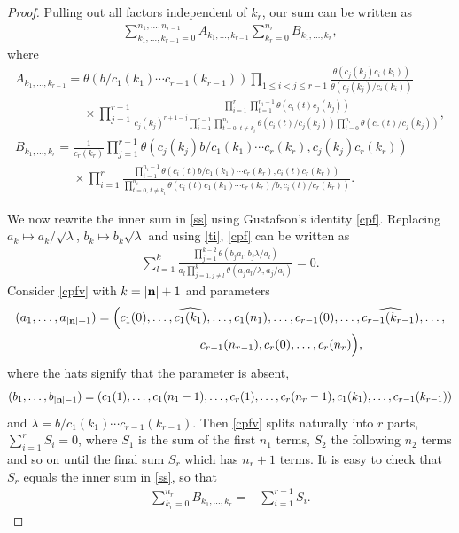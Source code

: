 \documentclass[pdftex]{sigma}%
\numberwithin{equation}{section}
\begin{document}
\begin{proof}
 Pulling out all factors independent of $k_r$, our
sum can be written as
\begin{gather}\label{ss}
\sum_{k_1,\dots,k_{r-1}=0}^{n_1,\dots,n_{r-1}}A_{k_1,\dots,k_{r-1}}
\sum_{k_r=0}^{n_r}B_{k_1,\dots,k_{r}},
\end{gather}
where
\begin{gather*}
A_{k_1,\dots,k_{r-1}}
=\theta(b/c_1(k_1)\dotsm c_{r-1}(k_{r-1}))\prod\limits_{1\leq i<j\leq
 r-1}\frac{\theta(c_j(k_j)c_i(k_i))}{\theta(c_j(k_j)/c_i(k_i))}
 \\ \phantom{A_{k_1,\dots,k_{r-1}}=}{}
\times\prod\limits_{j=1}^{r-1}\frac{\prod\limits_{i=1}^r\prod\limits_{t=1}^{n_i-1}
\theta(c_i(t)c_j(k_j))}
{c_j(k_j)^{r+1-j}\prod\limits_{i=1}^{r-1}\prod\limits_{t=0,\,t\neq
 k_i}^{n_i}\theta(c_i(t)/c_j(k_j))\prod\limits_{t=0}^{n_r}\theta(c_r(t)/c_j(k_j))},
\\
B_{k_1,\dots,k_{r}}=
\frac{1}{c_r(k_r)}\prod\limits_{j=1}^{r-1}
\theta(c_j(k_j)b/c_1(k_1)\dotsm c_r(k_r),c_j(k_j)c_r(k_r))
\\ \phantom{B_{k_1,\dots,k_{r}}=}{}
\times\prod\limits_{i=1}^r\frac{\prod\limits_{t=1}^{n_i-1}\theta(c_i(t)b/c_1(k_1)\dotsm
 c_r(k_r),c_i(t)c_r(k_r))}{\prod\limits_{t=0,\,t\neq
 k_i}^{n_i}\theta(c_i(t)c_1(k_1)\dotsm
 c_r(k_r)/b,c_i(t)/c_r(k_r))}.
 \end{gather*}

We now rewrite the inner sum in \eqref{ss} using
 Gustafson's identity \eqref{cpf}. Replacing $a_k\mapsto
a_k/\sqrt\lambda$, $b_k\mapsto b_k\sqrt\lambda$ and using \eqref{ti},
\eqref{cpf} can be written as
\begin{gather}\label{cpfv}
\sum_{l=1}^k\frac{\prod\limits_{j=1}^{k-2}\theta(b_ja_l,b_j\lambda/a_l)}
{a_l\prod\limits_{j=1, j\neq l}^k\theta(a_ja_l/\lambda,a_j/a_l)}=0.
\end{gather}
Consider \eqref{cpfv} with $k=|{\bf n}|+1$ and parameters
\begin{gather*}
(a_1,\dots,a_{|{\bf n}|+1})=
\Big(c_1(0),\dots,\widehat{c_1(k_1)},\dots,c_1(n_1),\dots, c_{r-1}(0),\dots,\widehat{c_{r-1}(k_{r-1})},
\dots,
\\ \phantom{(a_1,\dots,a_{|{\bf n}|+1})=(}
c_{r-1}(n_{r-1}), c_r(0),\dots,c_r(n_r)\Big),
\end{gather*}
where the hats signify that the parameter is absent,
\begin{gather*}
(b_1,\dots,b_{|{\bf n}|-1})=
(c_1(1),\dots,c_1(n_1-1),\dots, c_r(1),\dots,c_r(n_r-1),
c_1(k_1),\dots,c_{r-1}(k_{r-1}))
\end{gather*}
and $\lambda=b/c_1(k_1)\dotsm c_{r-1}(k_{r-1})$. Then \eqref{cpfv}
splits naturally into $r$ parts, $\sum_{i=1}^rS_i=0$, where $S_1$ is
the sum of the first $n_1$ terms, $S_2$ the following $n_2$ terms and
so on until the final sum $S_r$ which has $n_r+1$ terms. It is
easy to check that $S_r$ equals the inner sum in \eqref{ss}, so that
\begin{gather*}
\sum_{k_r=0}^{n_r}B_{k_1,\dots,k_{r}}=-\sum_{i=1}^{r-1}S_i.
\end{gather*}


\end{proof}
\end{document}
